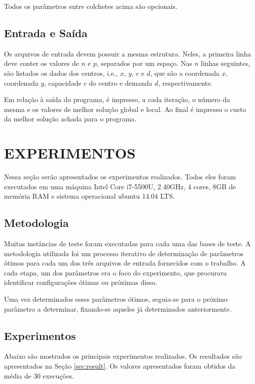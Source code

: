 \documentclass[12pt]{article}
\begin{document}
Todos os parâmetros entre colchetes acima são opcionais.

\subsection{Entrada e Saída}

Os arquivos de entrada devem possuir a mesma estrutura. Neles, a primeira linha deve conter
os valores de $ n $ e $ p $, separados por um espaço. Nas $ n $ linhas seguintes, são listados
os dados dos centros, i.e., $ x $, $ y $, $ c $ e $ d $, que são a coordenada $ x $, coordenada
$ y $, capacidade $ c $ do centro e demanda $ d $, respectivamente.

Em relação à saída do programa, é impresso, a cada iteração, o número da mesma e os valores
de melhor solução global e local. Ao final é impresso o custo da melhor solução achada para o
programa.

\section{EXPERIMENTOS}

Nessa seção serão apresentados os experimentos realizados. Todos eles foram executados em
uma máquina Intel Core i7-5500U, 2.40GHz, 4 cores, 8GB de memória RAM e sistema operacional
ubuntu 14.04 LTS.

\subsection{Metodologia}

Muitas instâncias de teste foram executadas para cada uma das bases de teste. A metodologia
utilizada foi um processo iterativo de determinação de parâmetros ótimos para cada um dos
três arquivos de entrada fornecidos com o trabalho. A cada etapa, um dos parâmetros era o 
foco do experimento, que procurava identificar configurações ótimas ou próximas disso.

Uma vez determinados esses parâmetros ótimos, seguia-se para o próximo parâmetro a determinar,
fixando-se aqueles já determinados anteriormente.

\subsection{Experimentos}

Abaixo são mostrados os principais experimentos realizados. Os resultados são apresentados
na Seção \ref{sec:result}. Os valores apresentados foram obtidos da média de 30 execuções.
\end{document}
